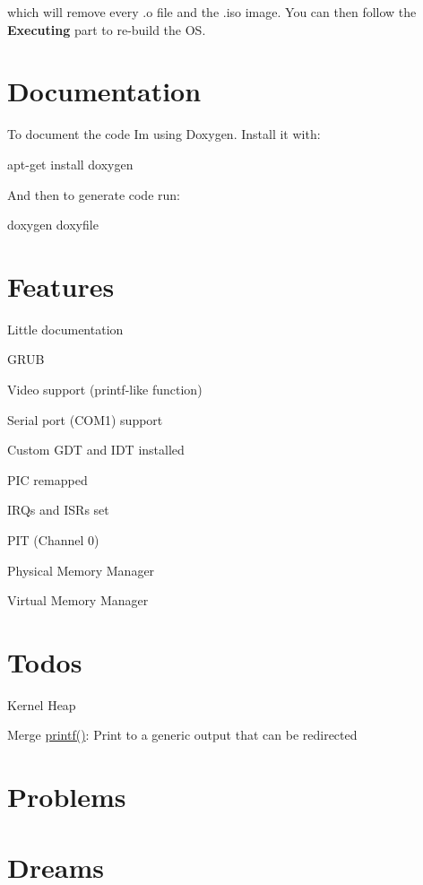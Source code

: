 which will remove every .o file and the .iso image. You can then follow the {\bfseries Executing} part to re-\/build the OS.\hypertarget{index_Documentation}{}\section{Documentation}\label{index_Documentation}
To document the code I\textquotesingle{}m using Doxygen. Install it with\+: 
\begin{DoxyCode}
apt-\textcolor{keyword}{get} install doxygen 
\end{DoxyCode}
 And then to generate code run\+: 
\begin{DoxyCode}
doxygen doxyfile
\end{DoxyCode}
\hypertarget{index_Features}{}\section{Features}\label{index_Features}

\begin{DoxyItemize}
\item Little documentation
\item G\+R\+UB
\item Video support (printf-\/like function)
\item Serial port (C\+O\+M1) support
\item Custom G\+DT and I\+DT installed
\item P\+IC remapped
\item I\+R\+Qs and I\+S\+Rs set
\item P\+IT (Channel 0)
\item Physical Memory Manager
\item Virtual Memory Manager
\end{DoxyItemize}\hypertarget{index_Todos}{}\section{Todos}\label{index_Todos}

\begin{DoxyItemize}
\item Kernel Heap
\item Merge \hyperlink{printf_8h_a98631211a4a8aee62f572375d5b637be}{printf()}\+: Print to a generic output that can be redirected
\end{DoxyItemize}\hypertarget{index_Problems}{}\section{Problems}\label{index_Problems}
\hypertarget{index_Dreams}{}\section{Dreams}\label{index_Dreams}

